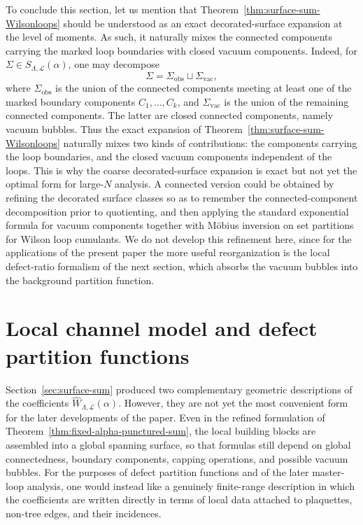 \documentclass[11pt,a4paper,reqno]{article}
\theoremstyle{definition}
\theoremstyle{remark}
\newcommand\Lc{{\mathcal{L}}}
\begin{document}
To conclude this section, let us mention that Theorem~\ref{thm:surface-sum-Wilsonloops} should be understood as an exact decorated-surface expansion at the level of moments. As such, it naturally mixes the connected components carrying the marked loop boundaries with closed vacuum components. Indeed, for $\Sigma\in S_{\Lambda,\Lc}(\alpha)$, one may decompose
\[
\Sigma=\Sigma_{\mathrm{obs}}\sqcup \Sigma_{\mathrm{vac}},
\]
where $\Sigma_{\mathrm{obs}}$ is the union of the connected components meeting at least one of the marked boundary components $C_1,\dots,C_k$, and $\Sigma_{\mathrm{vac}}$ is the union of the remaining connected components. The latter are closed connected components, namely vacuum bubbles. Thus the exact expansion of Theorem~\ref{thm:surface-sum-Wilsonloops} naturally mixes two kinds of contributions: the components carrying the loop boundaries, and the closed vacuum components independent of the loops. This is why the coarse decorated-surface expansion is exact but not yet the optimal form for large-$N$ analysis. A connected version could be obtained by refining the decorated surface classes so as to remember the connected-component decomposition prior to quotienting, and then applying the standard exponential formula for vacuum components together with M\"obius inversion on set partitions for Wilson loop cumulants. We do not develop this refinement here, since for the applications of the present paper the more useful reorganization is the local defect-ratio formalism of the next section, which absorbs the vacuum bubbles into the background partition function.

\section{Local channel model and defect partition functions}\label{sec:local-channel}

Section~\ref{sec:surface-sum} produced two complementary geometric descriptions of the coefficients $\widehat{W}_{\Lambda,\Lc}(\alpha).$ However, they are not yet the most convenient form for the later developments of the paper. Even in the refined formulation of Theorem~\ref{thm:fixed-alpha-punctured-sum}, the local building blocks are assembled into a global spanning surface, so that formulas still depend on global connectedness, boundary components, capping operations, and possible vacuum bubbles. For the purposes of defect partition functions and of the later master-loop analysis, one would instead like a genuinely finite-range description in which the coefficients are written directly in terms of local data attached to plaquettes, non-tree edges, and their incidences.
\end{document}

